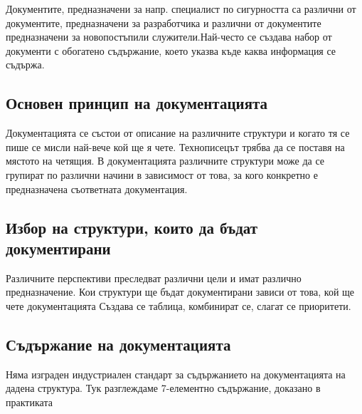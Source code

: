 \documentclass[fleqn,12pt]{article}
\begin{document}
Документите, предназначени за напр. специалист по сигурността са различни от документите, предназначени за разработчика и различни от документите предназначени за новопостъпили служители.Най-често се създава набор от документи с обогатено съдържание, което указва къде каква информация се съдържа.

\subsection{Основен принцип на документацията}
Документацията се състои от описание на различните структури и когато тя се пише се
мисли най-вече кой ще я чете. Технописецът трябва да се поставя на мястото на
четящия. В документацията различните структури може да се групират по различни
начини в зависимост от това, за кого конкретно е предназначена съответната
документация.


\subsection{Избор на структури, които да бъдат документирани}
Различните перспективи преследват различни цели и имат различно предназначение.
Кои структури ще бъдат документирани зависи от това, кой ще чете документацията
Създава се таблица, комбинират се, слагат се приоритети.

\subsection{Съдържание на документацията}
Няма изграден индустриален стандарт за съдържанието на документацията на дадена структура. Тук разглеждаме 7-елементно съдържание, доказано в практиката
\end{document}
